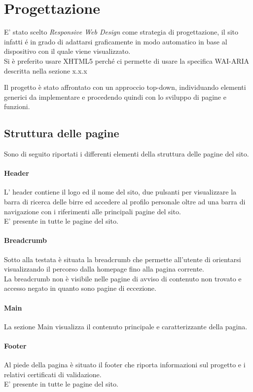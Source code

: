 \section{Progettazione}
E' stato scelto \textit{Responsive Web Design} come strategia di progettazione, il sito infatti é in grado di adattarsi graficamente in modo automatico in base al dispositivo con il quale viene visualizzato. \\
Si è preferito usare  XHTML5  perché  ci  permette  di  usare  la  specifica  WAI-ARIA descritta nella sezione x.x.x

Il progetto è stato affrontato con un approccio top-down, individuando elementi generici da implementare e procedendo quindi con lo sviluppo di pagine e funzioni.


\subsection{Struttura delle pagine}
Sono di seguito riportati i differenti elementi della struttura delle pagine del sito.
\paragraph{Header}
L' header contiene il logo ed il nome del sito, due pulsanti per visualizzare la barra di ricerca delle birre ed accedere al profilo personale oltre ad una barra di navigazione con i riferimenti alle principali pagine del sito.\\
E' presente in tutte le pagine del sito.
\paragraph{Breadcrumb}
Sotto alla testata è situata la breadcrumb che permette all'utente di orientarsi visualizzando il percorso dalla homepage fino alla pagina corrente.\\
La breadcrumb non è visibile nelle pagine di avviso di contenuto non trovato e accesso negato in quanto sono pagine di eccezione.
\paragraph{Main}
La sezione Main visualizza il contenuto principale e caratterizzante della pagina.
\paragraph{Footer}
Al piede della pagina è situato il footer che riporta informazioni sul progetto e i relativi certificati di validazione.\\
E' presente in tutte le pagine del sito.

